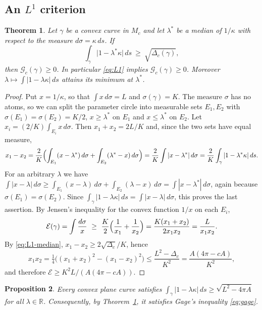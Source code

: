 \documentclass[11pt]{amsart}
\newtheorem{theorem}{Theorem}[section]
\newtheorem{proposition}[theorem]{Proposition}
\theoremstyle{definition}
\theoremstyle{remark}
\numberwithin{equation}{section}
\newcommand{\RR}{\mathbb{R}}
\newcommand{\E}{\mathcal{E}}
\newcommand{\G}{\mathcal{G}}
\begin{document}
\subsection{An \texorpdfstring{$L^1$}{L1} criterion}

\begin{theorem}\label{thm:L1}
Let $\gamma$ be a convex curve in $M_c$ and let $\lambda^*$ be a median of $1/\kappa$ with respect to the measure $d\sigma=\kappa\,ds$. If
\begin{equation}\label{eq:L1-median}
\int_\gamma\bigl|1-\lambda^*\kappa\bigr|\,ds\ \ge\ \sqrt{\Delta_c(\gamma)},
\end{equation}
then $\G_c(\gamma)\ge0$. In particular \eqref{eq:L1} implies $\G_c(\gamma)\ge0$. Moreover $\lambda\mapsto\int|1-\lambda\kappa|\,ds$ attains its minimum at $\lambda^*$.
\end{theorem}

\begin{proof}
Put $x=1/\kappa$, so that $\int x\,d\sigma=L$ and $\sigma(\gamma)=K$. The measure $\sigma$ has no atoms, so we can split the parameter circle into measurable sets $E_1,E_2$ with $\sigma(E_1)=\sigma(E_2)=K/2$, $x\ge\lambda^*$ on $E_1$ and $x\le\lambda^*$ on $E_2$. Let $x_i=(2/K)\int_{E_i}x\,d\sigma$. Then $x_1+x_2=2L/K$ and, since the two sets have equal measure,
\[
x_1-x_2=\frac2K\Bigl(\int_{E_1}(x-\lambda^*)\,d\sigma+\int_{E_2}(\lambda^*-x)\,d\sigma\Bigr)=\frac2K\int|x-\lambda^*|\,d\sigma=\frac2K\int_\gamma|1-\lambda^*\kappa|\,ds .
\]
For an arbitrary $\lambda$ we have $\int|x-\lambda|\,d\sigma\ge\int_{E_1}(x-\lambda)\,d\sigma+\int_{E_2}(\lambda-x)\,d\sigma=\int|x-\lambda^*|\,d\sigma$, again because $\sigma(E_1)=\sigma(E_2)$. Since $\int_\gamma|1-\lambda\kappa|\,ds=\int|x-\lambda|\,d\sigma$, this proves the last assertion. By Jensen's inequality for the convex function $1/x$ on each $E_i$,
\[
\E(\gamma)=\int\frac{d\sigma}{x}\ \ge\ \frac K2\Bigl(\frac1{x_1}+\frac1{x_2}\Bigr)=\frac{K(x_1+x_2)}{2x_1x_2}=\frac{L}{x_1x_2}.
\]
By \eqref{eq:L1-median}, $x_1-x_2\ge2\sqrt{\Delta_c}/K$, hence
\[
x_1x_2=\tfrac14\bigl((x_1+x_2)^2-(x_1-x_2)^2\bigr)\le\frac{L^2-\Delta_c}{K^2}=\frac{A(4\pi-cA)}{K^2},
\]
and therefore $\E\ge K^2L/(A(4\pi-cA))$.
\end{proof}

\begin{proposition}\label{prop:planar-L1}
Every convex plane curve satisfies $\int_\gamma|1-\lambda\kappa|\,ds\ge\sqrt{L^2-4\pi A}$ for all $\lambda\in\RR$. Consequently, by Theorem~\ref{thm:L1}, it satisfies Gage's inequality \eqref{eq:gage}.
\end{proposition}
\end{document}
